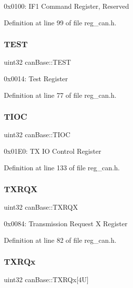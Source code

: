 0x0100\+: I\+F1 Command Register, Reserved 

Definition at line 99 of file reg\+\_\+can.\+h.

\mbox{\label{structcanBase_a4ac3103137aec39b89a353785f0f26af}} 
\subsubsection{\texorpdfstring{T\+E\+ST}{TEST}}
{\footnotesize\ttfamily uint32 can\+Base\+::\+T\+E\+ST}

0x0014\+: Test Register 

Definition at line 77 of file reg\+\_\+can.\+h.

\mbox{\label{structcanBase_a31ab7573f66e259c4ad5b515817e0bdb}} 
\subsubsection{\texorpdfstring{T\+I\+OC}{TIOC}}
{\footnotesize\ttfamily uint32 can\+Base\+::\+T\+I\+OC}

0x01\+E0\+: TX IO Control Register 

Definition at line 133 of file reg\+\_\+can.\+h.

\mbox{\label{structcanBase_a698a4f1bfb7f04bb23aa4105d42d6f65}} 
\subsubsection{\texorpdfstring{T\+X\+R\+QX}{TXRQX}}
{\footnotesize\ttfamily uint32 can\+Base\+::\+T\+X\+R\+QX}

0x0084\+: Transmission Request X Register 

Definition at line 82 of file reg\+\_\+can.\+h.

\mbox{\label{structcanBase_aa8046a659a6d6d5a1d732f8a99a08e65}} 
\subsubsection{\texorpdfstring{T\+X\+R\+Qx}{TXRQx}}
{\footnotesize\ttfamily uint32 can\+Base\+::\+T\+X\+R\+Qx\mbox{[}4\+U\mbox{]}}

